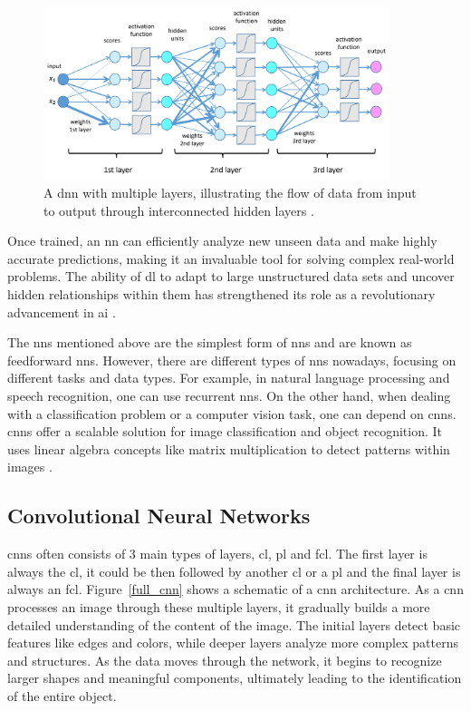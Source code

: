 \begin{figure}[ht]
    \centering
    \includegraphics[width=0.9\textwidth]{Figures/deepLearn_2_EN.png} 
    \caption{A \gls{dnn} with multiple layers, illustrating the flow of data from input to output through interconnected hidden layers \cite{DNN_pic}.}
    \label{DNN}
\end{figure}

Once trained, an \gls{nn} can efficiently analyze new unseen data and make highly accurate predictions, making it an invaluable tool for solving complex real-world problems. The ability of \gls{dl} to adapt to large unstructured data sets and uncover hidden relationships within them has strengthened its role as a revolutionary advancement in \gls{ai} \cite{DL_VS_ML} \cite{oD_Review}.

The \gls{nn}s mentioned above are the simplest form of \gls{nn}s and are known as feedforward \gls{nn}s. However, there are different types of \gls{nn}s nowadays, focusing on different tasks and data types. For example,  in natural language processing and speech recognition, one can use recurrent \gls{nn}s. On the other hand, when dealing with a classification problem or a computer vision task, one can depend on \gls{cnn}s. \gls{cnn}s offer a scalable solution for image classification and object recognition. It uses linear algebra concepts like matrix multiplication to detect patterns within images \cite{ibm_cnn}.

\subsection{Convolutional Neural Networks}
\gls{cnn}s often consists of 3 main types of layers, \gls{cl}, \gls{pl} and \gls{fcl}. The first layer is always the \gls{cl}, it could be then followed by another \gls{cl} or a \gls{pl} and the final layer is always an \gls{fcl}. Figure~\ref{full_cnn} shows a schematic of a \gls{cnn} architecture. As a \gls{cnn} processes an image through these multiple layers, it gradually builds a more detailed understanding of the content of the image. The initial layers detect basic features like edges and colors, while deeper layers analyze more complex patterns and structures. As the data moves through the network, it begins to recognize larger shapes and meaningful components, ultimately leading to the identification of the entire object.

